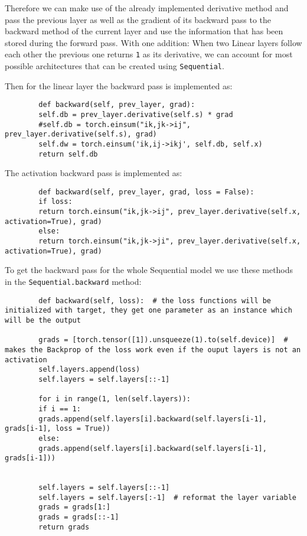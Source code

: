 \documentclass[11pt,english]{article}
\begin{document}
	Therefore we can make use of the already implemented derivative method and pass the previous layer as well as the gradient of its backward pass to the backward method of the current layer and use the information that has been stored during the forward pass. With one addition: When two Linear layers follow each other the previous one returns \lstinline|1| as its derivative, we can account for most possible architectures that can be created using \lstinline|Sequential|.
	
	Then for the linear layer the backward pass is implemented as:
	
	\begin{lstlisting}
		def backward(self, prev_layer, grad):
		self.db = prev_layer.derivative(self.s) * grad
		#self.db = torch.einsum("ik,jk->ij", prev_layer.derivative(self.s), grad)
		self.dw = torch.einsum('ik,ij->ikj', self.db, self.x)
		return self.db
	\end{lstlisting} 
	
	The activation backward pass is implemented as:
	
	\begin{lstlisting}
		def backward(self, prev_layer, grad, loss = False):
		if loss:
		return torch.einsum("ik,jk->ij", prev_layer.derivative(self.x, activation=True), grad) 
		else:
		return torch.einsum("ik,jk->ji", prev_layer.derivative(self.x, activation=True), grad) 
	\end{lstlisting}

	To get the backward pass for the whole Sequential model we use these methods in the \lstinline|Sequential.backward| method:
	
	\begin{lstlisting}
		def backward(self, loss):  # the loss functions will be initialized with target, they get one parameter as an instance which will be the output
		
		grads = [torch.tensor([1]).unsqueeze(1).to(self.device)]  # makes the Backprop of the loss work even if the ouput layers is not an activation
		self.layers.append(loss)
		self.layers = self.layers[::-1]
		
		for i in range(1, len(self.layers)):
		if i == 1:
		grads.append(self.layers[i].backward(self.layers[i-1], grads[i-1], loss = True))
		else:
		grads.append(self.layers[i].backward(self.layers[i-1], grads[i-1]))
		
		
		self.layers = self.layers[::-1]
		self.layers = self.layers[:-1]  # reformat the layer variable
		grads = grads[1:]
		grads = grads[::-1]
		return grads
	\end{lstlisting}
	
\end{document}
